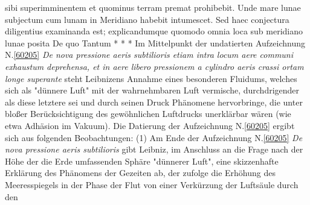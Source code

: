 sibi superimminentem %
et quominus terram premat prohibebit.%
%
Unde mare lunae subjectum%
cum lunam in Meridiano%
%
habebit intumescet.%
Sed haec conjectura%
diligentius
examinanda est;
explicandumque
quomodo omnia loca%
sub meridiano lunae posita
%
%
De quo
\pend%
\pstart%
Tantum
\pend%
\vspace*{1.5em}%
\pstart%
\noindent%
\centering%
*     *     *
\pend%
\vspace{2.75em}%
%
\frenchspacing%
\footnotesize%
\pstart%
\noindent%
%
Im Mittelpunkt der undatierten Aufzeichnung N.\;\ref{60205} \textit{De nova pressione aeris subtilioris etiam intra locum aere communi exhaustum deprehensa, et in aere libero pressionem a cylindro aeris crassi ortam longe superante} steht Leibnizens Annahme eines besonderen Fluidums, welches sich als "dünnere Luft" mit der wahrnehmbaren Luft vermische, durchdrigender als diese letztere sei und durch seinen Druck Phänomene hervorbringe, die unter bloßer Berücksichtigung des gewöhnlichen Luftdrucks unerklärbar wären (wie etwa Adhäsion im Vakuum).
Die Datierung der Aufzeichnung N.\;\ref{60205} ergibt sich aus folgenden Beobachtungen:
\pend%
\pstart%
(1)
Am Ende der Aufzeichnung N.\;\ref{60205} \textit{De nova pressione aeris subtilioris} gibt Leibniz, im Anschluss an die Frage nach der Höhe der die Erde um\-fassenden Sphäre "dünnerer Luft", eine skizzenhafte Erklärung des Phänomens der Gezeiten ab, der zufolge die Erhöhung des Meeresspiegels in der Phase der Flut von einer Verkürzung der Luftsäule durch den %
